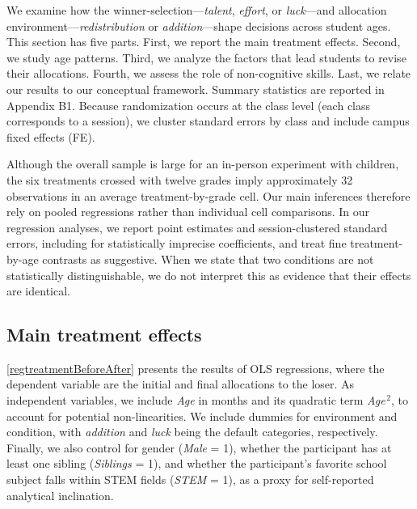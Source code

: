 \documentclass[11pt]{article}
\begin{document}
We examine how the winner-selection---\emph{talent}, \emph{effort}, or \emph{luck}---and allocation environment---\emph{redistribution} or \emph{addition}---shape decisions across student ages. This section has five parts. First, we report the main treatment effects. Second, we study age patterns. Third, we analyze the factors that lead students to revise their allocations. Fourth, we assess the role of non-cognitive skills. Last, we relate our results to our conceptual framework. Summary statistics are reported in Appendix B1. Because randomization occurs at the class level (each class corresponds to a session), we cluster standard errors by class and include campus fixed effects (FE).

Although the overall sample is large for an in-person experiment with children, the six treatments crossed with twelve grades imply approximately 32 observations in an average treatment-by-grade cell. Our main inferences therefore rely on pooled regressions rather than individual cell comparisons. In our regression analyses, we report point estimates and session-clustered standard errors, including for statistically imprecise coefficients, and treat fine treatment-by-age contrasts as suggestive. When we state that two conditions are not statistically distinguishable, we do not interpret this as evidence that their effects are identical.

\subsection{Main treatment effects \label{sec-treat}}

\autoref{regtreatmentBeforeAfter} presents the results of OLS regressions, where the dependent variable are the initial and final allocations to the loser. As independent variables, we include \emph{Age} in months and its quadratic term \emph{Age}$^{\,2}$, to account for potential non-linearities. We include dummies for environment and condition, with \emph{addition} and \emph{luck} being the default categories, respectively. Finally, we also control for gender (\emph{Male} = 1), whether the participant has at least one sibling (\emph{Siblings} = 1), and whether the participant's favorite school subject falls within STEM fields (\emph{STEM} = 1), as a proxy for self-reported analytical inclination.







\end{document}
